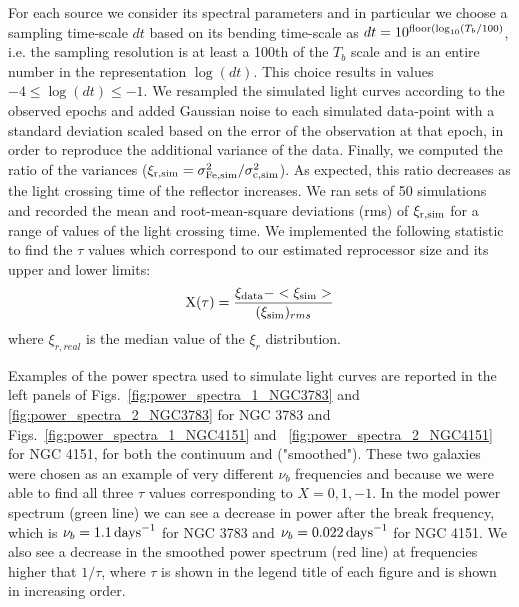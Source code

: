 For each source we consider its spectral parameters and in particular we choose a sampling time-scale $dt$ based on its bending time-scale as $dt=10^{{\rm floor}(\log_{10}(T_b/100)}$, i.e. the sampling resolution is at least a 100th of the $T_b$ scale and is an entire number in the representation $\log(dt)$. This choice results in values $-4\le\log(dt)\le-1$. We resampled the simulated light curves according to the observed epochs and added Gaussian noise to each simulated data-point with a standard deviation scaled based on the error of the observation at that epoch, in order to reproduce the additional variance of the data. Finally, we computed the ratio of the variances ($\xi_{\rm r,sim}=\sigma^2_{\rm Fe, sim}/\sigma^2_{\rm c,sim}$). As expected, this ratio decreases as the light crossing time of the reflector increases. We ran sets of 50 simulations and recorded the mean and root-mean-square deviations (rms) of $\xi_{\rm r,sim}$ for a range of values of the light crossing time. We implemented the following statistic to find the $\tau$ values which correspond to our estimated reprocessor size and its upper and lower limits:
\begin{equation}
    {\rm X}(\tau)=\frac{\xi_{\rm data}-<\xi_{\rm sim}>}{(\xi_{\rm sim})_{rms}}
    \label{eq:X_tau}
\end{equation}
 where $\xi_{r,real}$ is the median value of the $\xi_{r}$ distribution. %
 
 Examples of the power spectra used to simulate light curves are reported in the left panels of Figs.~\ref{fig:power_spectra_1_NGC3783} and \ref{fig:power_spectra_2_NGC3783} for NGC 3783 and Figs.~\ref{fig:power_spectra_1_NGC4151} and ~\ref{fig:power_spectra_2_NGC4151} for NGC 4151, for both the continuum and \kalfa{} ("smoothed"). These two galaxies were chosen as an example of very different $\nu_b$ frequencies and because we were able to find all three $\tau$ values corresponding to $X=0,1,-1$. In the model power spectrum (green line) we can see a decrease in power after the break frequency, which is $\nu_b=1.1 \,{\rm days}^{-1}$ for NGC 3783 and $\nu_b=0.022\,{\rm days}^{-1}$ for NGC 4151. We also see a decrease in the smoothed power spectrum (red line) at frequencies higher that $1/\tau$, where $\tau$ is shown in the legend title of each figure and is shown in increasing order.
 
